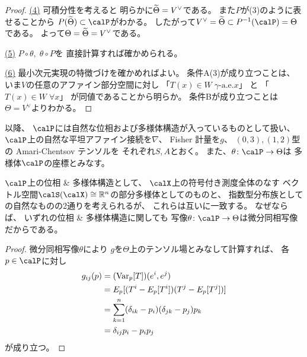 \documentclass[report]{jlreq}
\begin{document}
\begin{proof}
    \uline{(4)} \quad
    可積分性を考えると
    明らかに$\widetilde{\Theta} = V^\vee$である。
    また$P$が(3)のように表せることから
    $P(\wt{\Theta}) \subset \calP$がわかる。
    したがって$V^\vee = \wt{\Theta} \subset P^{-1}(\calP) = \Theta$である。
    よって$\Theta = \widetilde{\Theta} = V^\vee$である。

    \uline{(5)} \quad
    $P \circ \theta, \; \theta \circ P$を
    直接計算すれば確かめられる。

    \uline{(6)} \quad
    最小次元実現の特徴づけを確かめればよい。
    条件A(3)が成り立つことは、
    いま$V$の任意のアファイン部分空間に対し
    「$T(x) \in W \; \text{$\gamma$-a.e.$x$}$」
    と
    「$T(x) \in W \; \text{$\forall x$}$」
    が同値であることから明らか。
    条件Bが成り立つことは
    $\Theta = V^\vee$よりわかる。
\end{proof}

以降、
$\calP$には自然な位相および多様体構造が入っているものとして扱い、
$\calP$上の自然な平坦アファイン接続を$\nabla$、
Fisher 計量を$g$、
$(0, 3), (1, 2)$型の Amari-Chentsov テンソルを
それぞれ$S, A$とおく。
また、$\theta \colon \calP \to \Theta$は
多様体$\calP$の座標とみなす。

\begin{remark}
    $\calP$上の位相 \& 多様体構造として、
    $\calX$上の符号付き測度全体のなす
    ベクトル空間$\calS(\calX) \cong \R^n$の部分多様体としてのものと、
    指数型分布族としての自然なものの2通りを考えられるが、
    これらは互いに一致する。
    なぜならば、
    いずれの位相 \& 多様体構造に関しても
    写像$\theta \colon \calP \to \Theta$は微分同相写像だからである。
\end{remark}


\begin{proof}
    微分同相写像$\theta$により
    $g$を$\Theta$上のテンソル場とみなして計算すれば、
    各$p \in \calP$に対し
    \begin{alignat}{1}
        g_{ij}(p)
            &=
                (\operatorname{Var}_p [T])(e^i, e^j)
                \\
            &=
                E_p[(T^i - E_p[T^i])(T^j - E_p[T^j])]
                \\
            &=
                \sum_{k = 1}^n
                    (\delta_{ik} - p_i)
                    (\delta_{jk} - p_j)
                    p_k
                \\
            &=
                \delta_{ij} p_i - p_i p_j
    \end{alignat}
    が成り立つ。
\end{proof}
\end{document}
